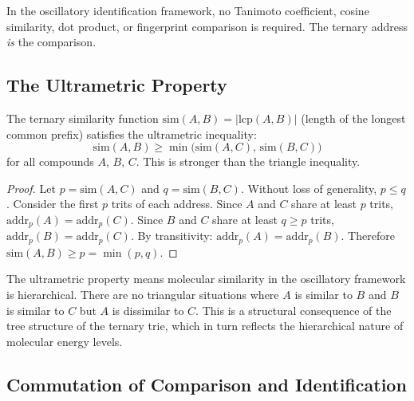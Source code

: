 \begin{corollary}
\label{cor:ch24-no-similarity}
In the oscillatory identification framework, no Tanimoto coefficient, cosine
similarity, dot product, or fingerprint comparison is required.  The ternary
address \emph{is} the comparison.
\end{corollary}

\subsection{The Ultrametric Property}
\label{sec:ch24-ultrametric}

\begin{proposition}
\label{prop:ch24-ultrametric}
The ternary similarity function $\mathrm{sim}(A,B) = |\mathrm{lcp}(A,B)|$
(length of the longest common prefix) satisfies the ultrametric inequality:
\begin{equation}
\label{eq:ch24-ultrametric}
  \mathrm{sim}(A,B) \geq \min\bigl(\mathrm{sim}(A,C),\,\mathrm{sim}(B,C)\bigr)
\end{equation}
for all compounds $A$, $B$, $C$.  This is stronger than the triangle inequality.
\end{proposition}

\begin{proof}
Let $p = \mathrm{sim}(A,C)$ and $q = \mathrm{sim}(B,C)$.  Without loss of
generality, $p \leq q$.  Consider the first $p$ trits of each address.  Since
$A$ and $C$ share at least $p$ trits, $\mathrm{addr}_p(A) = \mathrm{addr}_p(C)$.
Since $B$ and $C$ share at least $q \geq p$ trits, $\mathrm{addr}_p(B) =
\mathrm{addr}_p(C)$.  By transitivity: $\mathrm{addr}_p(A) = \mathrm{addr}_p(B)$.
Therefore $\mathrm{sim}(A,B) \geq p = \min(p,q)$.
\end{proof}

\begin{remark}
The ultrametric property means molecular similarity in the oscillatory
framework is hierarchical.  There are no triangular situations where $A$ is
similar to $B$ and $B$ is similar to $C$ but $A$ is dissimilar to $C$.  This
is a structural consequence of the tree structure of the ternary trie, which
in turn reflects the hierarchical nature of molecular energy levels.
\end{remark}

\subsection{Commutation of Comparison and Identification}
\label{sec:ch24-commutation}

